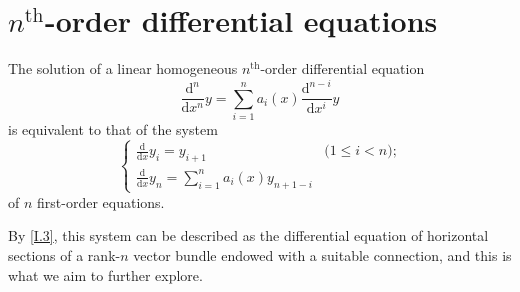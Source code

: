 \documentclass{report}
\theoremstyle{plain}
\theoremstyle{definition}
\newenvironment{env}[1]
    {\renewcommand\theinnercustomenv{#1}\innercustomenv}
    {\endinnercustomenv}
\newcommand{\dd}{\mathrm{d}}
\renewcommand{\leq}{\leqslant}
\begin{document}
\section{\texorpdfstring{$n^\mathrm{th}$}{nth}-order differential equations}
\label{I.4}

\begin{env}{4.1}
\label{I.4.1}
  The solution of a linear homogeneous $n^\mathrm{th}$-order differential equation
  \[
  \label{I.4.1.1}
    \frac{\dd^n}{\dd x^n}y = \sum_{i=1}^n a_i(x) \frac{\dd^{n-i}}{\dd x^i}y
  \tag{4.1.1}
  \]
  is equivalent to that of the system
  \[
  \label{I.4.1.2}
    \begin{cases}
      \frac{\dd}{\dd x}y_i
      = y_{i+1} &\mbox{($1\leq i<n$);}
    \\\frac{\dd}{\dd x}y_n
      = \sum_{i=1}^n a_i(x) y_{n+1-i}
    \end{cases}
  \tag{4.1.2}
  \]
  of $n$ first-order equations.

  By \cref{I.3}, this system can be described as the differential equation of horizontal sections of a rank-$n$ vector bundle endowed with a suitable connection, and this is what we aim to further explore.
\end{env}
\end{document}
